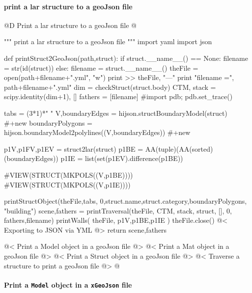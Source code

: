 \documentclass[11pt,oneside]{article}	%
\begin{document}
\paragraph{print a lar structure to a geoJson file}

@D Print a lar structure to a geoJson file
@{""" print a lar structure to a geoJson file """
import yaml
import json

def printStruct2GeoJson(path,struct):
    if struct.__name__() == None:
        filename = str(id(struct))
    else: 
        filename = struct.__name__()
    theFile = open(path+filename+".yml", "w")
    print >> theFile, "---"
    print "filename =", path+filename+".yml"
    dim = checkStruct(struct.body)
    CTM, stack = scipy.identity(dim+1), []
    fathers = [filename]
    #import pdb; pdb.set_trace()
    

    tabs = (3*1)*" "
    V,boundaryEdges = hijson.structBoundaryModel(struct)   #+new
    boundaryPolygons = hijson.boundaryModel2polylines((V,boundaryEdges))  #+new
    
    p1V,p1FV,p1EV = struct2lar(struct)
    p1BE = AA(tuple)(AA(sorted)(boundaryEdges))
    p1IE = list(set(p1EV).difference(p1BE))
    
    #VIEW(STRUCT(MKPOLS((V,p1BE))))
    #VIEW(STRUCT(MKPOLS((V,p1IE))))

    printStructObject(theFile,tabs, 0,struct.name,struct.category,boundaryPolygons, "building")
    scene,fathers = printTraversal(theFile, CTM, stack, struct, [], 0, fathers,filename) 
    printWalls( theFile, p1V,p1BE,p1IE )
    theFile.close()
    @< Exporting to JSON via YML @>
    return scene,fathers

@< Print a Model object in a geoJson file @>
@< Print a Mat object in a geoJson file @>
@< Print a Struct object in a geoJson file @>
@< Traverse a structure to print a geoJson file @>
@}

\paragraph{Print a \texttt{Model} object in a \texttt{xGeoJson} file}
\end{document}
